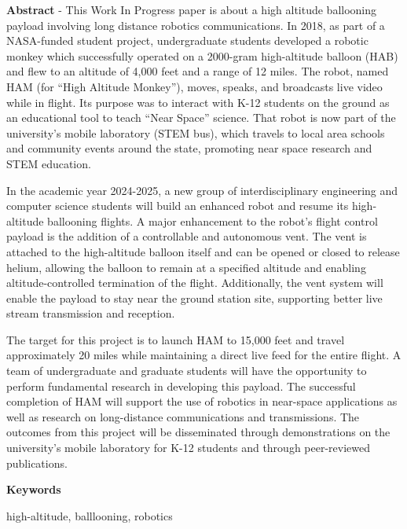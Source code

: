 \textbf{Abstract} - This Work In Progress paper is about a high altitude ballooning payload involving long distance robotics communications. In 2018, as part of a NASA-funded student project, undergraduate students developed a robotic monkey which successfully operated on a 2000-gram high-altitude balloon (HAB) and flew to an altitude of 4,000 feet and a range of 12 miles. The robot, named HAM (for “High Altitude Monkey”), moves, speaks, and broadcasts live video while in flight. Its purpose was to interact with K-12 students on the ground as an educational tool to teach “Near Space” science. That robot is now part of the university’s mobile laboratory (STEM bus), which travels to local area schools and community events around the state, promoting near space research and STEM education.

In the academic year 2024-2025, a new group of interdisciplinary engineering and computer science students will build an enhanced robot and resume its high-altitude ballooning flights. A major enhancement to the robot’s flight control payload is the addition of a controllable and autonomous vent. The vent is attached to the high-altitude balloon itself and can be opened or closed to release helium, allowing the balloon to remain at a specified altitude and enabling altitude-controlled termination of the flight. Additionally, the vent system will enable the payload to stay near the ground station site, supporting better live stream transmission and reception.

The target for this project is to launch HAM to 15,000 feet and travel approximately 20 miles while maintaining a direct live feed for the entire flight. A team of undergraduate and graduate students will have the opportunity to perform fundamental research in developing this payload. The successful completion of HAM will support the use of robotics in near-space applications as well as research on long-distance communications and transmissions. The outcomes from this project will be disseminated through demonstrations on the university’s mobile laboratory for K-12 students and through peer-reviewed publications.
    
\textbf{Keywords}

    high-altitude, balllooning, robotics

